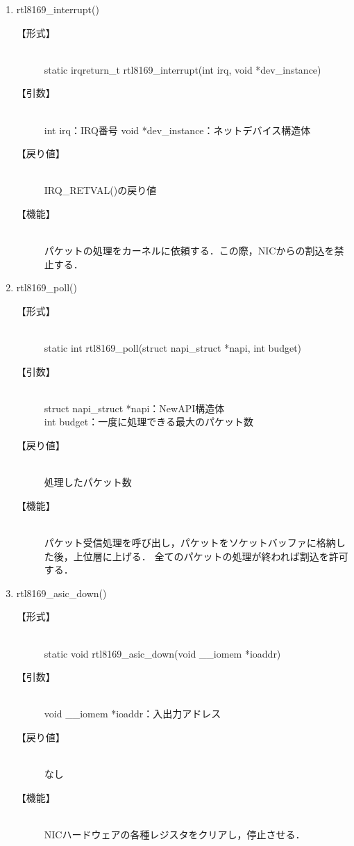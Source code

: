 \documentclass[12pt]{jsarticle}
\begin{document}
\begin{enumerate}
    \item rtl8169\_interrupt()
        \begin{description}
            \item[【形式】]\mbox{}\\
                static irqreturn\_t rtl8169\_interrupt(int irq, void *dev\_instance)
            \item[【引数】]\mbox{}\\
                int irq：IRQ番号
                void *dev\_instance：ネットデバイス構造体
            \item[【戻り値】]\mbox{}\\
                IRQ\_RETVAL()の戻り値
            \item[【機能】]\mbox{}\\
                パケットの処理をカーネルに依頼する．この際，NICからの割込を禁止する．
        \end{description}

    \item rtl8169\_poll()
        \begin{description}
            \item[【形式】]\mbox{}\\
                static int rtl8169\_poll(struct napi\_struct *napi, int budget)
            \item[【引数】]\mbox{}\\
                struct napi\_struct *napi：NewAPI構造体\\
                int budget：一度に処理できる最大のパケット数
            \item[【戻り値】]\mbox{}\\
                処理したパケット数
            \item[【機能】]\mbox{}\\
                パケット受信処理を呼び出し，パケットをソケットバッファに格納した後，上位層に上げる．
                全てのパケットの処理が終われば割込を許可する．
        \end{description}

    \item rtl8169\_asic\_down()
        \begin{description}
            \item[【形式】]\mbox{}\\
                static void rtl8169\_asic\_down(void \_\_iomem *ioaddr)
            \item[【引数】]\mbox{}\\
                void \_\_iomem *ioaddr：入出力アドレス
            \item[【戻り値】]\mbox{}\\
                なし
            \item[【機能】]\mbox{}\\
                NICハードウェアの各種レジスタをクリアし，停止させる．
        \end{description}

\end{enumerate}
\end{document}
